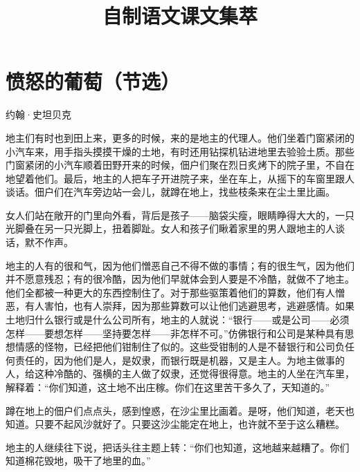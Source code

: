 \documentclass[12pt,UTF-8,openany]{ctexbook}
\title{\zihao{0} \bfseries 自制语文课文集萃}
\author{}
\date{}
\begin{document}
\maketitle
\tableofcontents
\newpage

\chapter{愤怒的葡萄（节选）}

\begin{center}
    
    \vspace{8pt}
    约翰·史坦贝克
    \vspace{8pt}

\end{center}

地主们有时也到田上来，更多的时候，来的是地主的代理人。他们坐着门窗紧闭的小汽车来，用手指头摸摸干燥的土地，有时还用钻探机钻进地里去验验土质。那些门窗紧闭的小汽车顺着田野开来的时候，佃户们聚在烈日炙烤下的院子里，不自在地望着他们。最后，地主的人把车子开进院子来，坐在车上，从摇下的车窗里跟人谈话。佃户们在汽车旁边站一会儿，就蹲在地上，找些枝条来在尘土里比画。
    
    女人们站在敞开的门里向外看，背后是孩子——脑袋尖瘦，眼睛睁得大大的，一只光脚叠在另一只光脚上，扭着脚趾。女人和孩子们瞅着家里的男人跟地主的人谈话，默不作声。
    
    地主的人有的很和气，因为他们憎恶自己不得不做的事情；有的很生气，因为他们并不愿意残忍；有的很冷酷，因为他们早就体会到人要是不冷酷，就做不了地主。他们全都被一种更大的东西控制住了。对于那些驱策着他们的算数，他们有人憎恶，有人害怕，也有人崇拜，因为那些算数可以让他们逃避思考，逃避感情。如果土地归什么银行或是什么公司所有，地主的人就说：“银行——或是公司——必须怎样——要想怎样——坚持要怎样——非怎样不可。”仿佛银行和公司是某种具有思想情感的怪物，已经把他们钳制住了似的。这些受钳制的人是不替银行和公司负任何责任的，因为他们是人，是奴隶，而银行既是机器，又是主人。为地主做事的人，给这种冷酷的、强横的主人做了奴隶，还觉得很得意。地主的人坐在汽车里，解释着：“你们知道，这土地不出庄稼。你们在这里苦干多久了，天知道的。”
    
    蹲在地上的佃户们点点头，感到惶惑，在沙尘里比画着。是呀，他们知道，老天也知道。只要不起风沙就好了。只要这沙尘能定在地上，也许就不至于这么糟糕。
    
    地主的人继续往下说，把话头往主题上转：“你们也知道，这地越来越糟了。你们知道棉花毁地，吸干了地里的血。”
    
\end{document}

